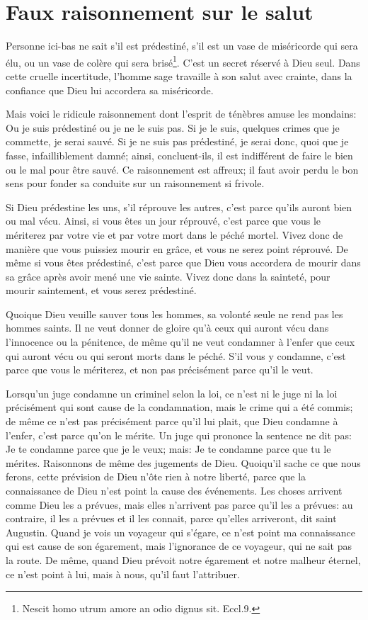 \documentclass[instructions.tex]{subfiles}
\begin{document}
 
\chapter{Faux raisonnement sur le salut}
 

\primo Personne ici-bas ne sait s'il est prédestiné, s'il est un vase de miséricorde qui sera élu, ou un vase de colère qui sera brisé\footnote{Nescit homo utrum amore an odio dignus sit. Eccl.9.}. C'est un secret réservé à Dieu seul. Dans cette cruelle incertitude, l'homme sage travaille à son salut avec crainte, dans la confiance que Dieu lui accordera sa miséricorde. 

Mais voici le ridicule raisonnement dont l'esprit de ténèbres amuse les mondains: \og Ou je suis prédestiné ou je ne le suis pas. Si je le suis, quelques crimes que je commette, je serai sauvé. Si je ne suis pas prédestiné, je serai donc, quoi que je fasse, infailliblement damné\fg; ainsi, concluent-ils, \og il est indifférent de faire le bien ou le mal pour être sauvé\fg. Ce raisonnement est affreux; il faut avoir perdu le bon sens pour fonder sa conduite sur un raisonnement si frivole. 

Si Dieu prédestine les uns, s'il réprouve les autres, c'est parce qu'ils auront bien ou mal vécu. Ainsi, si vous êtes un jour réprouvé, c'est parce que vous le mériterez par votre vie et par votre mort dans le péché mortel. Vivez donc de manière que vous puissiez mourir en grâce, et vous ne serez point réprouvé. De même si vous êtes prédestiné, c'est parce que Dieu vous accordera de mourir dans sa grâce après avoir mené une vie sainte. Vivez donc dans la sainteté, pour mourir saintement, et vous serez prédestiné. 

Quoique Dieu veuille sauver tous les hommes, sa volonté seule ne rend pas les hommes saints. Il ne veut donner de gloire qu'à ceux qui auront vécu dans l'innocence ou la pénitence, de même qu'il ne veut condamner à l'enfer que ceux qui auront vécu ou qui seront morts dans le péché. S'il vous y condamne, c'est parce que vous le mériterez, et non pas précisément parce qu'il le veut. 

Lorsqu'un juge condamne un criminel selon la loi, ce n'est ni le juge ni la loi précisément qui sont cause de la condamnation, mais le crime qui a été commis; de même ce n'est pas précisément parce qu'il lui plait, que Dieu condamne à l'enfer, c'est parce qu'on le mérite. Un juge qui prononce la sentence ne dit pas: \og Je te condamne parce que je le veux\fg; mais: \og Je te condamne parce que tu le mérites\fg. Raisonnons de même des jugements de Dieu. 
Quoiqu'il sache ce que nous ferons, cette prévision de Dieu n'ôte rien à notre liberté, parce que la connaissance de Dieu n'est point la cause des événements. Les choses arrivent comme Dieu les a prévues, \og mais elles n'arrivent pas parce qu'il les a prévues: au contraire, il les a prévues et il les connait, parce qu'elles arriveront\fg, dit saint Augustin. Quand je vois un voyageur qui s'égare, ce n'est point ma connaissance qui est cause de son égarement, mais l'ignorance de ce voyageur, qui ne sait pas la route. De même, quand Dieu prévoit notre égarement et notre malheur éternel, ce n'est point à lui, mais à nous, qu'il faut l'attribuer. 
\end{document}
